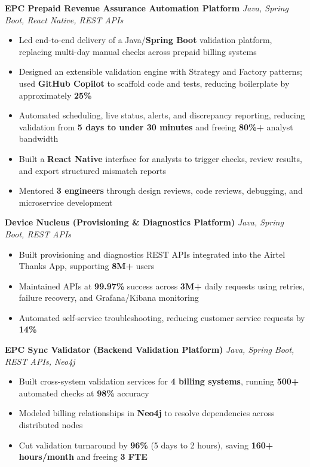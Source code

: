 \documentclass[letterpaper,11pt]{article}
\newcommand{\resumeItem}[1]{
  \item\small{{#1 \vspace{-2pt}}}
}
\newcommand{\resumeItemListStart}{\begin{itemize}}
\newcommand{\resumeItemListEnd}{\end{itemize}\vspace{-5pt}}
\begin{document}
      \vspace{4pt}
      \textbf{\small EPC Prepaid Revenue Assurance Automation Platform} \hfill \textit{\small Java, Spring Boot, React Native, REST APIs} \\
      \vspace{-2pt}
      \resumeItemListStart
        \resumeItem{Led end-to-end delivery of a Java/\textbf{Spring Boot} validation platform, replacing multi-day manual checks across prepaid billing systems}
        \resumeItem{Designed an extensible validation engine with Strategy and Factory patterns; used \textbf{GitHub Copilot} to scaffold code and tests, reducing boilerplate by approximately \textbf{25\%}}
        \resumeItem{Automated scheduling, live status, alerts, and discrepancy reporting, reducing validation from \textbf{5 days to under 30 minutes} and freeing \textbf{80\%+} analyst bandwidth}
        \resumeItem{Built a \textbf{React Native} interface for analysts to trigger checks, review results, and export structured mismatch reports}
        \resumeItem{Mentored \textbf{3 engineers} through design reviews, code reviews, debugging, and microservice development}
      \resumeItemListEnd

      \vspace{4pt}
      \textbf{\small Device Nucleus (Provisioning \& Diagnostics Platform)} \hfill \textit{\small Java, Spring Boot, REST APIs} \\
      \vspace{-2pt}
      \resumeItemListStart
        \resumeItem{Built provisioning and diagnostics REST APIs integrated into the Airtel Thanks App, supporting \textbf{8M+} users}
        \resumeItem{Maintained APIs at \textbf{99.97\%} success across \textbf{3M+} daily requests using retries, failure recovery, and Grafana/Kibana monitoring}
        \resumeItem{Automated self-service troubleshooting, reducing customer service requests by \textbf{14\%}}
      \resumeItemListEnd

      \vspace{4pt}
      \textbf{\small EPC Sync Validator (Backend Validation Platform)} \hfill \textit{\small Java, Spring Boot, REST APIs, Neo4j} \\
      \vspace{-2pt}
      \resumeItemListStart
        \resumeItem{Built cross-system validation services for \textbf{4 billing systems}, running \textbf{500+} automated checks at \textbf{98\%} accuracy}
        \resumeItem{Modeled billing relationships in \textbf{Neo4j} to resolve dependencies across distributed nodes}
        \resumeItem{Cut validation turnaround by \textbf{96\%} (5 days to 2 hours), saving \textbf{160+ hours/month} and freeing \textbf{3 FTE}}
      \resumeItemListEnd
\end{document}
